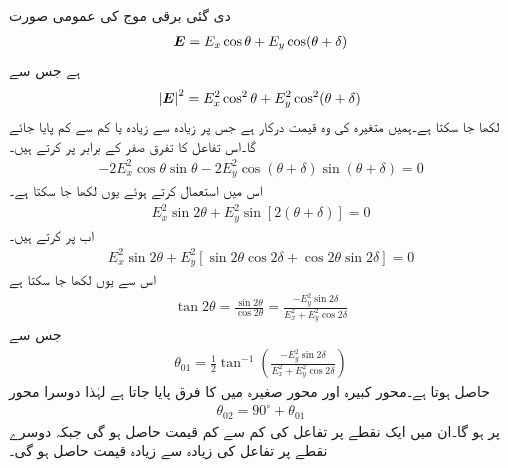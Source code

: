 دی گئی برقی موج کی عمومی صورت
\begin{align}
{\ensuremath{{\boldsymbol{E}}}}=E_x \cos \theta+E_y\cos(\theta+\delta)
\end{align}
ہے جس سے
\begin{align*}
\abs{{{\boldsymbol{E}}}}^2=E_x^2 \cos^2 \theta +E_y^2 \cos^2(\theta+\delta)
\end{align*}
لکھا جا سکتا ہے۔ہمیں متغیرہ  کی وہ قیمت درکار ہے جس پر  زیادہ سے زیادہ یا کم سے کم پایا جائے گا۔اس تفاعل کا تفرق صفر کے برابر پر کرتے ہیں۔
\begin{align*}
-2 E_x^2 \cos \theta \sin \theta -2 E_y^2 \cos(\theta+\delta) \sin(\theta+\delta)=0 
\end{align*}
اس میں  استعمال کرتے  ہوئے یوں لکھا جا سکتا ہے۔
\begin{align*}
E_x^2 \sin 2\theta+E_y^2 \sin[2(\theta+\delta)]=0
\end{align*}
اب  پر کرتے ہیں۔
\begin{align*}
E_x^2 \sin 2\theta +E_y^2 [\sin 2 \theta \cos 2 \delta +\cos 2 \theta \sin 2 \delta]=0
\end{align*}
اس سے یوں لکھا جا سکتا ہے
\begin{align*}
\tan 2 \theta =\frac{\sin 2 \theta}{\cos 2 \theta}=\frac{-E_y^2 \sin 2 \delta}{E_x^2+E_y^2 \cos 2 \delta}
\end{align*}
جس سے
\begin{align}\label{مساوات_قطبیت_رداس_الف}
\theta_{01}=\frac{1}{2} \tan^{-1}\left( \frac{-E_y^2 \sin 2 \delta}{E_x^2+E_y^2 \cos 2 \delta}\right)
\end{align}
حاصل ہوتا ہے۔محور کبیرہ اور محور صغیرہ میں  کا فرق پایا جاتا ہے لہٰذا دوسرا محور
\begin{align}\label{مساوات_قطبیت_رداس_ب}
\theta_{02}=90^{\circ}+\theta_{01}
\end{align}
پر ہو گا۔ان میں ایک نقطے پر تفاعل کی کم سے کم قیمت حاصل ہو گی جبکہ دوسرے نقطے پر تفاعل کی زیادہ سے زیادہ قیمت حاصل ہو گی۔

